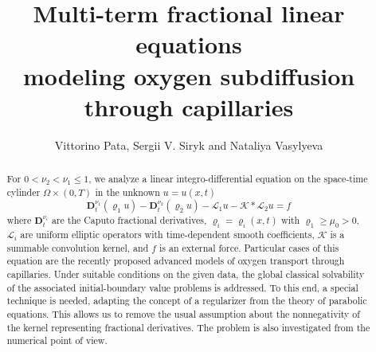\documentclass[reqno]{amsart}
\theoremstyle{definition}
\numberwithin{equation}{section}
\begin{document}
\title[Multi-term subdiffusion equations]
{Multi-term fractional linear equations\\ 
modeling oxygen subdiffusion through capillaries}

\author[V. Pata, S.V. Siryk and N. Vasylyeva]
{Vittorino Pata, Sergii V. Siryk and Nataliya Vasylyeva}
\address{Dipartimento di Matematica, Politecnico di Milano
\newline\indent
Via Bonardi 9, 20133 Milano, Italy}

\address{CONCEPT Lab, Istituto Italiano di Tecnologia
\newline\indent
Via Morego 30, 16163, Genova, Italy}

\address{Institute of Applied Mathematics and Mechanics of NASU
\newline\indent
G.Batyuka st. 19, 84100 Sloviansk, Ukraine;
\newline\indent and
Dipartimento di Matematica, Politecnico di Milano
\newline\indent
Via Bonardi 9, 20133 Milano, Italy
}


\begin{abstract}
For $0<\nu_2<\nu_1\leq 1$, we analyze a linear integro-differential
equation on the space-time cylinder $\Omega\times(0,T)$
in the unknown $u=u(x,t)$
$$\mathbf{D}_{t}^{\nu_1}(\varrho_{1}u)-\mathbf{D}_{t}^{\nu_2}(\varrho_2 u)-\mathcal{L}_{1}u-\mathcal{K}*\mathcal{L}_{2}u =f$$
where $\mathbf{D}_{t}^{\nu_i}$ are the Caputo fractional derivatives,
$\varrho_i=\varrho_i(x,t)$ with $\varrho_1\geq \mu_0>0$,
$\mathcal{L}_{i}$ are uniform elliptic
operators with time-dependent smooth coefficients,
$\mathcal{K}$ is a summable convolution kernel, and $f$ is an external force. Particular cases of this equation are the recently proposed advanced models of oxygen transport through capillaries. Under suitable
conditions on the given data, the global classical solvability of the associated initial-boundary value problems is addressed.
To this end, a special technique is needed,
adapting the concept of a regularizer from the theory of parabolic equations. This allows us to remove the usual assumption about the nonnegativity of the kernel representing fractional derivatives.
The problem is also investigated from the numerical point of view.
\end{abstract}
\end{document}
